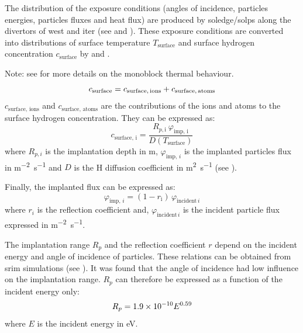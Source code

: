 The distribution of the exposure conditions (angles of incidence, particles energies, particles fluxes and heat flux) are produced by \gls{soledge}/\gls{solps} along the \glspl{divertor} of \gls{west} and \gls{iter} (see  and ).
These exposure conditions are converted into distributions of surface temperature $T_\mathrm{surface}$ and surface hydrogen concentration $c_\mathrm{surface}$ by  and .

Note: see  for more details on the \gls{monoblock} thermal behaviour.
\begin{equation}
    c_\mathrm{surface} = c_\mathrm{surface, \, ions} + c_\mathrm{surface, \, atoms}
    \labeq{c_surface}
\end{equation}
$c_\mathrm{surface, \, ions}$ and $c_\mathrm{surface, \, atoms}$ are the contributions of the ions and atoms to the surface hydrogen concentration.
They can be expressed as:
\begin{equation}
    c_\mathrm{surface, \, i} = \frac{R_{p, \mathrm{i}} \ \varphi_\mathrm{imp, \,i}}{D(T_\mathrm{surface})}
\end{equation}
where $R_{p, i}$ is the implantation depth in \si{m}, $\varphi_{\mathrm{imp}, \,i}$ is the implanted particles flux in \si{m^{-2}.s^{-1}} and $D$ is the \gls{H} diffusion coefficient in \si{m^{2}.s^{-1}} (see ).

Finally, the implanted flux can be expressed as:
\begin{equation}
    \varphi_{\mathrm{imp}, \,i} = (1 - r_\mathrm{i}) \, \varphi_{\mathrm{incident} \, i}
\end{equation}
where $r_i$ is the reflection coefficient and, $\varphi_{\mathrm{incident} \, i}$ is the incident particle flux expressed in \si{m^{-2}.s^{-1}}.

The implantation range $R_p$ and the reflection coefficient $r$ depend on the incident energy and angle of incidence of particles.
These relations can be obtained from \gls{srim}  simulations (see ).
It was found that the angle of incidence had low influence on the implantation range.
$R_p$ can therefore be expressed as a function of the incident energy only:
\begin{equation}
    R_p = 1.9\times 10^{-10} E ^{0.59}
    \labeq{implantation range}
\end{equation}
where $E$ is the incident energy in \si{eV}.

